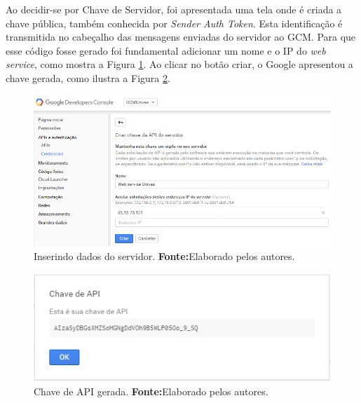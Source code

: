 	\par Ao decidir-se por Chave de Servidor, foi apresentada uma tela onde é
criada a chave pública, também conhecida por \textit{Sender Auth Token}. Esta
identificação é transmitida no cabeçalho das mensagens enviadas do servidor ao
GCM. Para que esse código fosse gerado foi fundamental adicionar um nome e o IP
do \textit{web service}, como mostra a Figura \ref{fig:gcm8}. Ao clicar no
botão criar, o Google apresentou a chave gerada, como ilustra a Figura
\ref{fig:gcm9}.

	\begin{figure}[h!] 
		\centerline{\includegraphics[scale=0.55]{./imagens/2_q_metodologico/4_procedimentos_resultados/41_gcm/gcm8.png}}
		\caption[Inserindo dados do servidor]{Inserindo dados do servidor.
		\textbf{Fonte:}Elaborado pelos autores.}
		\label{fig:gcm8}
	\end{figure}
	
	\begin{figure}[h!] 
		\centerline{\includegraphics[scale=0.7]{./imagens/2_q_metodologico/4_procedimentos_resultados/41_gcm/gcm9.png}}
		\caption[Chave de API gerada]{Chave de API gerada.
		\textbf{Fonte:}Elaborado pelos autores.}
		\label{fig:gcm9}
	\end{figure}
